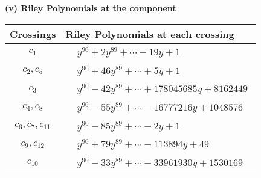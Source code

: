 \documentclass[1p]{elsarticle_modified}
\theoremstyle{definition}
\begin{document}
\newpage\renewcommand{\arraystretch}{1}
\flushleft \textbf{(v) Riley Polynomials at the component}\newline \\
\begin{tabular}{m{50pt}|m{274pt}}
Crossings & \hspace{64pt}Riley Polynomials at each crossing \\
\hline $$\begin{aligned}c_{1}\end{aligned}$$&$\begin{aligned}
&y^{90}+2 y^{89}+\cdots-19 y+1
\end{aligned}$\\
\hline $$\begin{aligned}c_{2},c_{5}\end{aligned}$$&$\begin{aligned}
&y^{90}+46 y^{89}+\cdots+5 y+1
\end{aligned}$\\
\hline $$\begin{aligned}c_{3}\end{aligned}$$&$\begin{aligned}
&y^{90}-42 y^{89}+\cdots+178045685 y+8162449
\end{aligned}$\\
\hline $$\begin{aligned}c_{4},c_{8}\end{aligned}$$&$\begin{aligned}
&y^{90}-55 y^{89}+\cdots-16777216 y+1048576
\end{aligned}$\\
\hline $$\begin{aligned}c_{6},c_{7},c_{11}\end{aligned}$$&$\begin{aligned}
&y^{90}-85 y^{89}+\cdots-2 y+1
\end{aligned}$\\
\hline $$\begin{aligned}c_{9},c_{12}\end{aligned}$$&$\begin{aligned}
&y^{90}+79 y^{89}+\cdots-113894 y+49
\end{aligned}$\\
\hline $$\begin{aligned}c_{10}\end{aligned}$$&$\begin{aligned}
&y^{90}-33 y^{89}+\cdots-33961930 y+1530169
\end{aligned}$\\
\hline
\end{tabular}\\~\\
\end{document}
